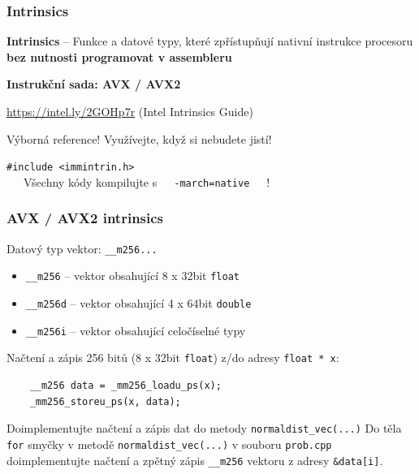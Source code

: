 \documentclass[usenames,dvipsnames,9pt]{beamer}
\begin{document}
\begin{frame}
  \frametitle{Intrinsics}

  {\large \textbf{Intrinsics} -- Funkce a datové typy, které zpřístupňují nativní instrukce procesoru \textbf{bez nutnosti programovat v assembleru}}

  \vspace{1em}

  \hfill{\LARGE\bf Instrukční sada: AVX / AVX2}

  \pause

   \vspace{3em}
   \url{https://intel.ly/2GOHp7r} (Intel Intrinsics Guide)

   \hspace{10pt} Výborná reference! Využívejte, když si nebudete jistí!
\end{frame}

\begin{frame}[standout]
  \texttt{\#include <immintrin.h>} \\[2em]
  \faWarning\ \ \ Všechny kódy kompilujte s\ \ \  \texttt{-march=native}\ \ \ !
\end{frame}

\begin{frame}[fragile]
  \frametitle{AVX / AVX2 intrinsics}

  Datový typ vektor: \texttt{\_\_m256...}
  \begin{itemize}
    \item \texttt{\_\_m256} -- vektor obsahující 8 x 32bit \texttt{float}
    \item \texttt{\_\_m256d} -- vektor obsahující 4 x 64bit \texttt{double}
    \item \texttt{\_\_m256i} -- vektor obsahující celočíselné typy
  \end{itemize}

  Načtení a zápis 256 bitů (8 x 32bit \texttt{float}) z/do adresy \texttt{float * x}:
  \begin{verbatim}
    __m256 data = _mm256_loadu_ps(x);
    _mm256_storeu_ps(x, data);
  \end{verbatim}

  \vspace{1.5em}
  \pause

  \begin{block}{Doimplementujte načtení a zápis dat do metody \texttt{normaldist\_vec(...)}}
    Do těla \texttt{for} smyčky v metodě \texttt{normaldist\_vec(...)} v souboru \texttt{prob.cpp} doimplementujte načtení a zpětný zápis \texttt{\_\_m256} vektoru z adresy \texttt{\&data[i]}.
  \end{block}
\end{frame}
\end{document}
